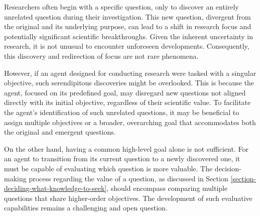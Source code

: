 Researchers often begin with a specific question, only to discover an entirely unrelated question during their investigation. This new question, divergent from the original and its underlying purpose, can lead to a shift in research focus and potentially significant scientific breakthroughs. Given the inherent uncertainty in research, it is not unusual to encounter unforeseen developments. Consequently, this discovery and redirection of focus are not rare phenomena.

However, if an agent designed for conducting research were tasked with a singular objective, such serendipitous discoveries might be overlooked. This is because the agent, focused on its predefined goal, may disregard new questions not aligned directly with its initial objective, regardless of their scientific value. To facilitate the agent's identification of such unrelated questions, it may be beneficial to assign multiple objectives or a broader, overarching goal that accommodates both the original and emergent questions.

On the other hand, having a common high-level goal alone is not sufficient. For an agent to transition from its current question to a newly discovered one, it must be capable of evaluating which question is more valuable. The decision-making process regarding the value of a question, as discussed in Section \ref{section-deciding-what-knowledge-to-seek}, should encompass comparing multiple questions that share higher-order objectives. The development of such evaluative capabilities remains a challenging and open question.



